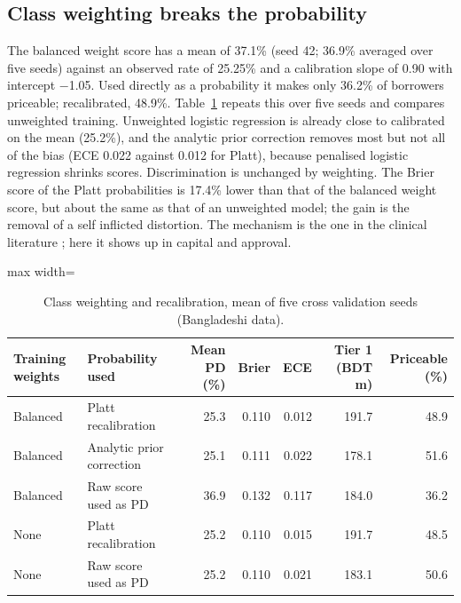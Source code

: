 \documentclass[11pt,a4paper]{article}
\newcommand{\tabsize}{\footnotesize}
\begin{document}
\subsection{Class weighting breaks the probability}
The balanced weight score has a mean of 37.1\% (seed 42; 36.9\% averaged over five seeds) against an observed rate of 25.25\% and a calibration slope of 0.90 with intercept $-$1.05. Used directly as a probability it makes only 36.2\% of borrowers priceable; recalibrated, 48.9\%. Table~\ref{tab:cw} repeats this over five seeds and compares unweighted training. Unweighted logistic regression is already close to calibrated on the mean (25.2\%), and the analytic prior correction removes most but not all of the bias (ECE 0.022 against 0.012 for Platt), because penalised logistic regression shrinks scores. Discrimination is unchanged by weighting. The Brier score of the Platt probabilities is 17.4\% lower than that of the balanced weight score, but about the same as that of an unweighted model; the gain is the removal of a self inflicted distortion. The mechanism is the one in the clinical literature \citep{VanDenGoorbergh2022}; here it shows up in capital and approval.
\begin{table}[H]\centering\tabsize\caption{Class weighting and recalibration, mean of five cross validation seeds (Bangladeshi data).}\label{tab:cw}
\begin{adjustbox}{max width=\textwidth}
\begin{tabular}{llrrrrr}
\toprule
Training weights & Probability used & Mean PD (\%) & Brier & ECE & Tier 1 (BDT m) & Priceable (\%) \\
\midrule
Balanced & Platt recalibration & 25.3 & 0.110 & 0.012 & 191.7 & 48.9 \\
Balanced & Analytic prior correction & 25.1 & 0.111 & 0.022 & 178.1 & 51.6 \\
Balanced & Raw score used as PD & 36.9 & 0.132 & 0.117 & 184.0 & 36.2 \\
None & Platt recalibration & 25.2 & 0.110 & 0.015 & 191.7 & 48.5 \\
None & Raw score used as PD & 25.2 & 0.110 & 0.021 & 183.1 & 50.6 \\
\bottomrule
\end{tabular}
\end{adjustbox}\end{table}
\end{document}
